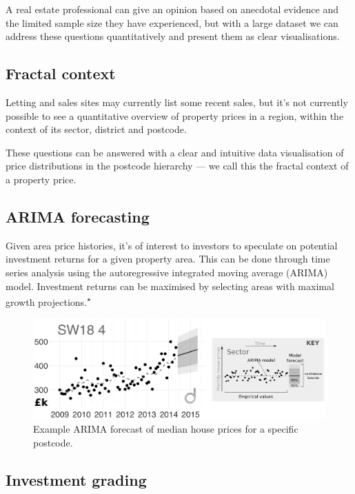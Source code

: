 \documentclass[
10pt, %
a4paper, %
oneside, %
headinclude,footinclude, %
BCOR5mm, %
]{scrartcl}
\begin{document}
A real estate professional can give an opinion based on anecdotal
evidence and the limited sample size they have experienced, but with a
large dataset we can address these questions quantitatively and
present them as clear visualisations.

\subsection{Fractal context}

Letting and sales sites may currently list some recent sales, but it's
not currently possible to see a quantitative overview of property
prices in a region, within the context of its sector, district and
postcode.

These questions can be answered with a clear and intuitive data
visualisation of price distributions in the postcode hierarchy --- we
call this the fractal context of a property price.

\subsection{ARIMA forecasting}

Given area price histories, it's of interest to investors to speculate
on potential investment returns for a given property area. This can be
done through time series analysis using the autoregressive integrated
moving average (ARIMA) model. Investment returns can be maximised by
selecting areas with maximal growth
projections.\textsuperscript{$\star$} \\

\begin{figure}[h]
\begin{center}
\includegraphics[width=.9\textwidth]{Figures/arima.png}
\caption{Example ARIMA forecast of median house prices for a specific postcode.}
\end{center}
\end{figure}

\vspace{-2em}
\subsection{Investment grading}
\end{document}

